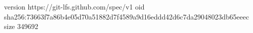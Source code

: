 version https://git-lfs.github.com/spec/v1
oid sha256:73663f7a86b4e05d70a51882d7f4589a9d16eddd42d6c7da29048023db65eeec
size 349692
